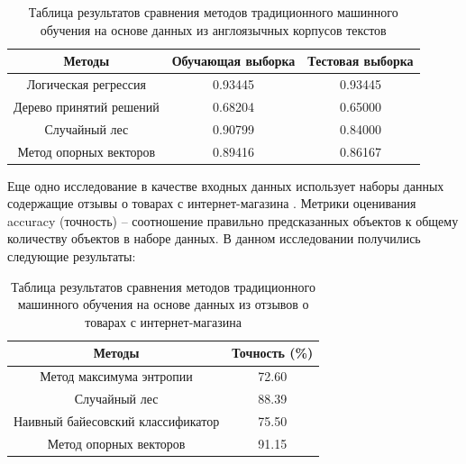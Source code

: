 \documentclass[a4paper,14pt, unknownkeysallowed]{extreport}
\begin{document}
	\begin{table}[H]
		\caption{Таблица результатов сравнения методов традиционного машинного обучения на основе данных из англоязычных корпусов текстов}
		
		\begin{center}
			
		\begin{tabular}{|c|c|c|}
			\hline
			Методы & Обучающая выборка & Тестовая выборка \\
			\hline
			Логическая регрессия & 0.93445 & 0.93445 \\
			\hline
			Дерево принятий решений & 0.68204 & 0.65000 \\
			\hline
			Случайный лес & 0.90799 & 0.84000 \\
			\hline
			Метод опорных векторов & 0.89416 & 0.86167 \\
			\hline
			
		\end{tabular}
			
		\end{center}
	\end{table}

	Еще одно исследование в качестве входных данных использует наборы данных содержащие отзывы о товарах с интернет-магазина \cite{Samigulin}. Метрики оценивания accuracy (точность) -- соотношение правильно предсказанных объектов к общему количеству объектов в наборе данных. В данном исследовании получились следующие результаты:

	\begin{table}[H]
		\caption{Таблица результатов сравнения методов традиционного машинного обучения на основе данных из отзывов о товарах с интернет-магазина}
		
		\begin{center}
			
			\begin{tabular}{|c|c|}
				\hline
				Методы & Точность (\%) \\
				\hline
				Метод максимума энтропии & 72.60 \\
				\hline
				Случайный лес & 88.39 \\
				\hline
				Наивный байесовский классификатор & 75.50 \\
				\hline
				Метод опорных векторов & 91.15 \\
				\hline
				
			\end{tabular}
			
		\end{center}
	\end{table}
\end{document}
